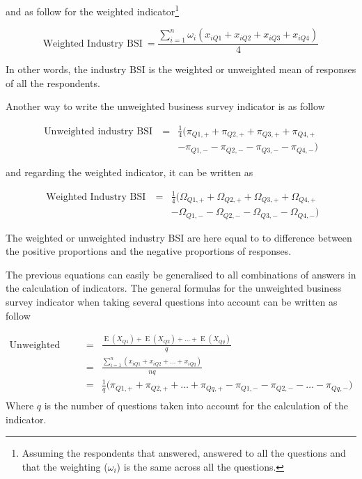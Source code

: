 \documentclass[12pt,a4paper,oneside]{book}
\DeclareMathOperator{\E}{E}
\begin{document}
and as follow for the weighted indicator\footnote{Assuming the respondents that answered, answered to all the questions and that the weighting ($\omega_i$) is the same across all the questions.}

\begin{equation}
    \mbox{Weighted Industry BSI}\ = \frac{\sum^n_{i=1} \omega_i (x_{iQ1} + x_{iQ2} + x_{iQ3} + x_{iQ4})}{4} 
\end{equation} 

In other words, the industry BSI is the weighted or unweighted mean of responses of all the respondents.

Another way to write the unweighted business survey indicator is as follow

\begin{eqnarray}
    \mbox{Unweighted industry BSI}\ &=& \frac{1}{4} \big( \pi_{Q1,+} + \pi_{Q2,+} + \pi_{Q3,+} + \pi_{Q4,+} \nonumber \\
    && - \pi_{Q1,-} - \pi_{Q2,-} - \pi_{Q3,-} - \pi_{Q4,-} \big)
\end{eqnarray}

and regarding the weighted indicator, it can be written as

\begin{eqnarray}
    \mbox{ Weighted Industry BSI}\ &=& \frac{1}{4} \big( \Omega_{Q1,+} + \Omega_{Q2,+} + \Omega_{Q3,+} + \Omega_{Q4,+} \nonumber \\
    && - \Omega_{Q1,-} - \Omega_{Q2,-} - \Omega_{Q3,-} - \Omega_{Q4,-} \big) 
\end{eqnarray}

The weighted or unweighted industry BSI are here equal to to difference between the positive proportions and the negative proportions of responses.


The previous equations can easily be generalised to all combinations of answers in the calculation of indicators.
The general formulas for the unweighted business survey indicator when taking several questions into account can be written as follow

\begin{eqnarray}
    \mbox{Unweighted BSI} &=& \frac{\E(X_{Q1}) + \E(X_{Q2}) + \ldots + \E(X_{Qq})}{q} \\
    &=& \frac{\sum^n_{i=1}( x_{iQ1} + x_{iQ2} + \ldots + x_{iQq})}{nq} \\
    &=& \frac{1}{q} \big( \pi_{Q1,+} +  \pi_{Q2,+} + \ldots +  \pi_{Qq,+}  -  \pi_{Q1,-} -  \pi_{Q2,-} - \ldots - \pi_{Qq,-} \big) \nonumber\\
\end{eqnarray}
Where $q$ is the number of questions taken into account for the calculation of the indicator.
\end{document}

